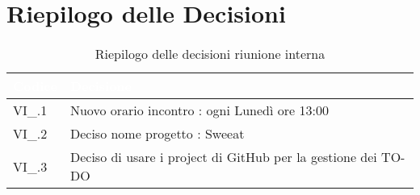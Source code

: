 \section{Riepilogo delle Decisioni}


\begin{table}[!htbp]
\renewcommand{\arraystretch}{1.5}
\begin{tabular}{m{}<{\centering}  m{}<{\centering}}
\rowcolor{darkblue} \textcolor{white}{\textbf{Codice}} & \textcolor{white}{\textbf{Decisione}} \\
\hline
VI\_\D{}.1 & Nuovo orario incontro : ogni Lunedì ore 13:00 \\
\rowcolor{gray!10} VI\_\D{}.2 & Deciso nome progetto : Sweeat \\
VI\_\D{}.3 & Deciso di usare i project di GitHub per la gestione dei TO-DO\\
\end{tabular}
\caption{Riepilogo delle decisioni riunione interna \D{}}
\end{table}